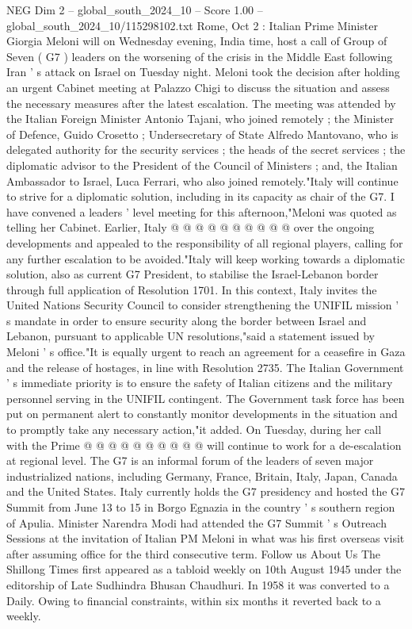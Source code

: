 \begin{textsample}{NEG Dim 2 – global\_south\_2024\_10 – Score 1.00 – global\_south\_2024\_10/115298102.txt}  \label{ex:f2_neg_314}
Rome, Oct 2 : Italian Prime Minister Giorgia Meloni will on Wednesday evening, India time, host a call of Group of Seven ( G7 ) leaders on the worsening of the crisis in the Middle East following Iran ' s attack on Israel on Tuesday night.
Meloni took the decision after holding an urgent Cabinet meeting at Palazzo Chigi to discuss the situation and assess the necessary measures after the latest escalation.
The meeting was attended by the Italian Foreign Minister Antonio Tajani, who joined remotely ; the Minister of Defence, Guido Crosetto ; Undersecretary of State Alfredo Mantovano, who is delegated authority for the security services ; the heads of the secret services ; the diplomatic advisor to the President of the Council of Ministers ; and, the Italian Ambassador to Israel, Luca Ferrari, who also joined remotely."Italy will continue to strive for a diplomatic solution, including in its capacity as chair of the G7.
I have convened a leaders ' level meeting for this afternoon,"Meloni was quoted as telling her Cabinet.
Earlier, Italy @ @ @ @ @ @ @ @ @ @ over the ongoing developments and appealed to the responsibility of all regional players, calling for any further escalation to be avoided."Italy will keep working towards a diplomatic solution, also as current G7 President, to stabilise the Israel-Lebanon border through full application of Resolution 1701.
In this context, Italy invites the United Nations Security Council to consider strengthening the UNIFIL mission ' s mandate in order to ensure security along the border between Israel and Lebanon, pursuant to applicable UN resolutions,"said a statement issued by Meloni ' s office."It is equally urgent to reach an agreement for a ceasefire in Gaza and the release of hostages, in line with Resolution 2735.
The Italian Government ' s immediate priority is to ensure the safety of Italian citizens and the military personnel serving in the UNIFIL contingent.
The Government task force has been put on permanent alert to constantly monitor developments in the situation and to promptly take any necessary action,"it added.
On Tuesday, during her call with the Prime @ @ @ @ @ @ @ @ @ @ will continue to work for a de-escalation at regional level.
The G7 is an informal forum of the leaders of seven major industrialized nations, including Germany, France, Britain, Italy, Japan, Canada and the United States.
Italy currently holds the G7 presidency and hosted the G7 Summit from June 13 to 15 in Borgo Egnazia in the country ' s southern region of Apulia.
Minister Narendra Modi had attended the G7 Summit ' s Outreach Sessions at the invitation of Italian PM Meloni in what was his first overseas visit after assuming office for the third consecutive term.
Follow us About Us The Shillong Times first appeared as a tabloid weekly on 10th August 1945 under the editorship of Late Sudhindra Bhusan Chaudhuri.
In 1958 it was converted to a Daily.
Owing to financial constraints, within six months it reverted back to a weekly.

\end{textsample}
